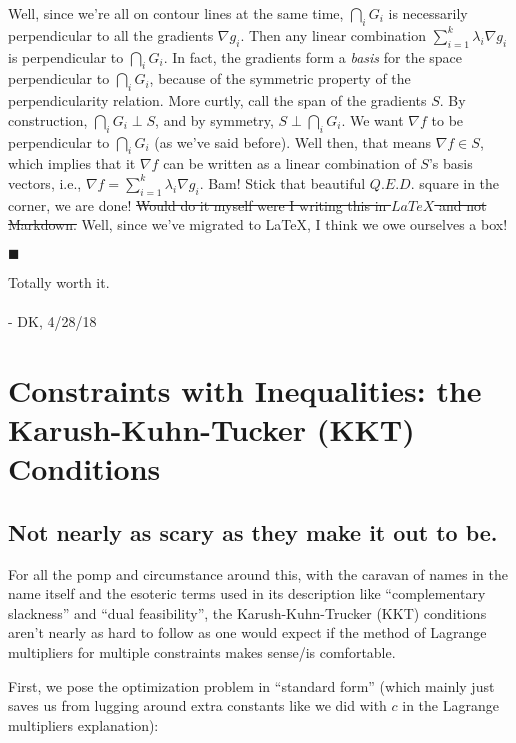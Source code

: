 \documentclass[letterpaper,12pt]{report}
\begin{document}
Well, since we're all on contour lines at the same time,
\(\bigcap _i G_i\) is necessarily perpendicular to all the gradients
\(\nabla g_i\). Then any linear combination \(\sum_{i=1}^k
\lambda _i \nabla g_i \) is perpendicular to \(\bigcap _i G_i\).
In fact, the gradients form a \emph{basis} for the space perpendicular
to \(\bigcap _i G_i\), because of the symmetric property of the
perpendicularity relation. More curtly, call the span of the gradients
\(S\). By construction, \(\bigcap _i G_i \perp S\), and by symmetry, \(S
\perp \bigcap _i G_i\). We want \(\nabla f\) to be perpendicular to
\(\bigcap _i G_i\) (as we've said before). Well then, that means
\(\nabla f \in S\), which implies that it \(\nabla f\) can be written as
a linear combination of \(S\)'s basis vectors, i.e., \( \nabla f =
\sum _{i=1}^k \lambda _i \nabla g_i \). Bam! Stick that beautiful
\(Q.E.D.\) square in the corner, we are done! \sout{Would do it myself were I
writing this in \(LaTeX\) and not Markdown.} 
Well, since we've migrated to LaTeX, I think we owe ourselves a box!
\begin{flushright}$\blacksquare$\end{flushright}
Totally worth it.
\\
\\
- DK, 4/28/18

\newpage

\section{Constraints with Inequalities: the Karush-Kuhn-Tucker (KKT)
Conditions}\label{constraints-with-inequalities-the-karush-kuhn-tucker-kkt-conditions}

\subsection{Not nearly as scary as they make it out to
be.}\label{not-nearly-as-scary-as-they-make-it-out-to-be.}

For all the pomp and circumstance around this, with the caravan of names
in the name itself and the esoteric terms used in its description like
``complementary slackness'' and ``dual feasibility'', the
Karush-Kuhn-Trucker (KKT) conditions aren't nearly as hard to follow as
one would expect if the method of Lagrange multipliers for multiple
constraints makes sense/is comfortable.

First, we pose the optimization problem in ``standard form'' (which mainly
just saves us from lugging around extra constants like we did with \(c\)
in the Lagrange multipliers explanation):
\end{document}

